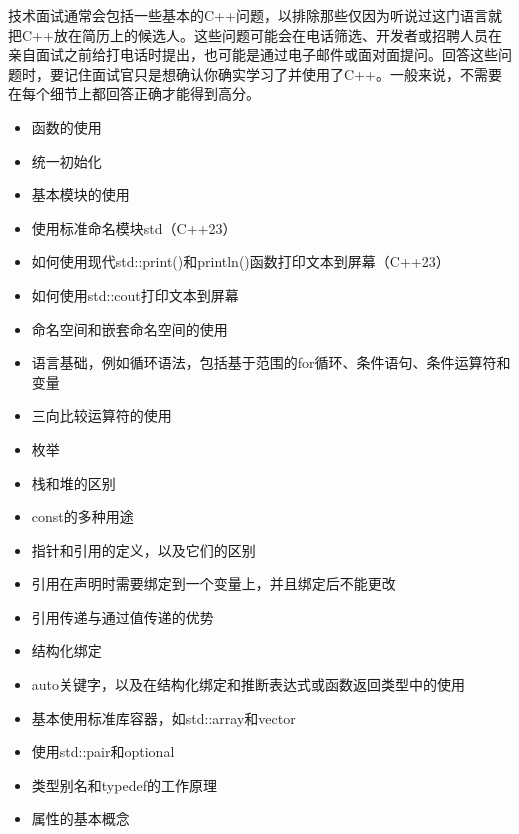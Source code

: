 
技术面试通常会包括一些基本的C++问题，以排除那些仅因为听说过这门语言就把C++放在简历上的候选人。这些问题可能会在电话筛选、开发者或招聘人员在亲自面试之前给打电话时提出，也可能是通过电子邮件或面对面提问。回答这些问题时，要记住面试官只是想确认你确实学习了并使用了C++。一般来说，不需要在每个细节上都回答正确才能得到高分。


\begin{itemize}
\item
函数的使用

\item
统一初始化

\item
基本模块的使用

\item
使用标准命名模块std（C++23）

\item
如何使用现代std::print()和println()函数打印文本到屏幕（C++23）

\item
如何使用std::cout打印文本到屏幕

\item
命名空间和嵌套命名空间的使用

\item
语言基础，例如循环语法，包括基于范围的for循环、条件语句、条件运算符和变量

\item
三向比较运算符的使用

\item
枚举

\item
栈和堆的区别

\item
const的多种用途

\item
指针和引用的定义，以及它们的区别

\item
引用在声明时需要绑定到一个变量上，并且绑定后不能更改

\item
引用传递与通过值传递的优势

\item
结构化绑定

\item
auto关键字，以及在结构化绑定和推断表达式或函数返回类型中的使用

\item
基本使用标准库容器，如std::array和vector

\item
使用std::pair和optional

\item
类型别名和typedef的工作原理

\item
属性的基本概念
\end{itemize}

